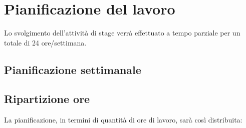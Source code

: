 
\section*{Pianificazione del lavoro}

Lo svolgimento dell'attività di stage verrà effettuato a tempo parziale per un totale di 24 ore/settimana.

\subsection*{Pianificazione settimanale}
\prospettoSettimanale

\newpage

\subsection*{Ripartizione ore}

La pianificazione, in termini di quantità di ore di lavoro, sarà così distribuita:

\begin{center}
    
\end{center}

\newpage